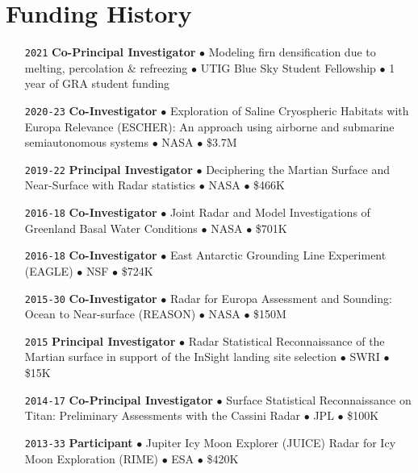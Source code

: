 \section*{Funding History}

\begin{itemize}[leftmargin=5.8em, labelsep=1.5em]
    \setlength\itemsep{-.3em}
    
    \item[\texttt{2021}] \textbf{Co-Principal Investigator} $\bullet$ Modeling firn densification due to melting, percolation \& refreezing $\bullet$ UTIG Blue Sky Student Fellowship $\bullet$ 1 year of GRA student funding
    
    \item[\texttt{2020-23}] \textbf{Co-Investigator} $\bullet$ Exploration of Saline Cryospheric Habitats with Europa Relevance (ESCHER): An approach using airborne and submarine semiautonomous systems $\bullet$ NASA $\bullet$ \$3.7M
    
    \item[\texttt{2019-22}] \textbf{Principal Investigator} $\bullet$ Deciphering the Martian Surface and Near-Surface with Radar statistics $\bullet$ NASA $\bullet$ \$466K
    
    \item[\texttt{2016-18}] \textbf{Co-Investigator} $\bullet$ Joint Radar and Model Investigations of Greenland Basal Water Conditions $\bullet$ NASA $\bullet$ \$701K
    
    \item[\texttt{2016-18}] \textbf{Co-Investigator} $\bullet$ East Antarctic Grounding Line Experiment (EAGLE) $\bullet$ NSF $\bullet$ \$724K
    
    \item[\texttt{2015-30}] \textbf{Co-Investigator} $\bullet$ Radar for Europa Assessment and Sounding: Ocean to Near-surface (REASON) $\bullet$ NASA $\bullet$ \$150M
    
    \item[\texttt{2015}] \textbf{Principal Investigator} $\bullet$ Radar Statistical Reconnaissance of the Martian surface in support of the InSight landing site selection $\bullet$ SWRI $\bullet$ \$15K
    
    \item[\texttt{2014-17}] \textbf{Co-Principal Investigator} $\bullet$ Surface Statistical Reconnaissance on Titan: Preliminary Assessments with the Cassini Radar $\bullet$ JPL $\bullet$ \$100K
    
    \item[\texttt{2013-33}] \textbf{Participant} $\bullet$ Jupiter Icy Moon  Explorer (JUICE) Radar for Icy Moon Exploration (RIME) $\bullet$ ESA $\bullet$ \$420K
    

\end{itemize}
